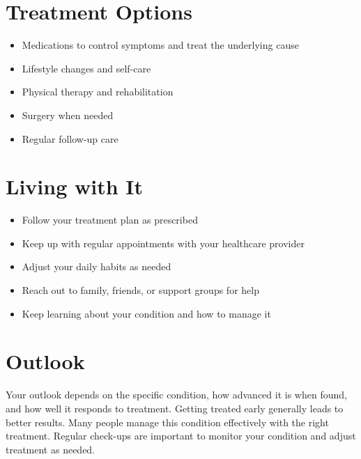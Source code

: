 \section{Treatment Options}

\begin{itemize}[noitemsep]
  \item Medications to control symptoms and treat the underlying cause
  \item Lifestyle changes and self-care
  \item Physical therapy and rehabilitation
  \item Surgery when needed
  \item Regular follow-up care
\end{itemize}

\section{Living with It}

\begin{itemize}[noitemsep]
  \item Follow your treatment plan as prescribed
  \item Keep up with regular appointments with your healthcare provider
  \item Adjust your daily habits as needed
  \item Reach out to family, friends, or support groups for help
  \item Keep learning about your condition and how to manage it
\end{itemize}

\section{Outlook}
Your outlook depends on the specific condition, how advanced it is when found, and how well it responds to treatment. Getting treated early generally leads to better results. Many people manage this condition effectively with the right treatment. Regular check-ups are important to monitor your condition and adjust treatment as needed.

